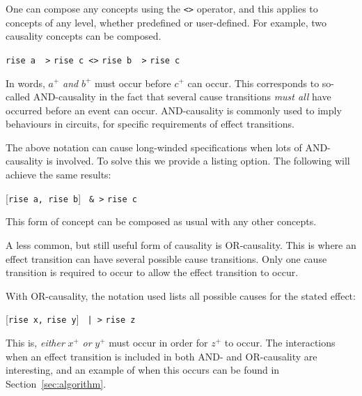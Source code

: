 \documentclass[british,conference,compsoc]{IEEEtran}
\begin{document}

One can compose any concepts using the \texttt{<>} 
operator, and this applies
to concepts of any level, whether predefined or user-defined. For example, 
two causality concepts can be composed.

\begin{center}
\texttt{rise a ~>} \texttt{rise c <>} \texttt{rise b ~>} \texttt{rise c}
\end{center}

In words, $a^{+}$ \emph{and} $b^{+}$ must occur before $c^{+}$ can occur. 
This corresponds to so-called AND-causality in the fact that several cause 
transitions \emph{must all} have occurred before an event can occur. 
AND-causality is commonly used to imply behaviours in circuits, for specific 
requirements of effect transitions.  

The above notation can cause long-winded specifications when lots of 
AND-causality is involved. To solve this we provide a listing option. The 
following will achieve the same results:

\begin{center}
      [\texttt{rise a,}\texttt{ rise b}] \texttt{~&~>} \texttt{rise c}
\end{center}

This form of concept can be composed as usual with any other concepts.

A less common, but still useful form of causality is OR-causality. This is 
where an effect transition can have several possible cause transitions. Only 
one cause transition is required to occur to allow the effect transition to 
occur. 

With OR-causality, the notation used lists all possible causes for the stated 
effect:

\begin{center}
      [\texttt{rise x,} \texttt{rise y}] \texttt{~|~>} \texttt{rise z}
\end{center}

This is, \emph{either} $x^{+}$ \emph{or} $y^{+}$ must occur in order for 
$z^{+}$ to occur. The interactions when an effect transition is included in both AND- and 
OR-causality are interesting, and an example of when this occurs can be found 
in Section~\ref{sec:algorithm}.
\end{document}
